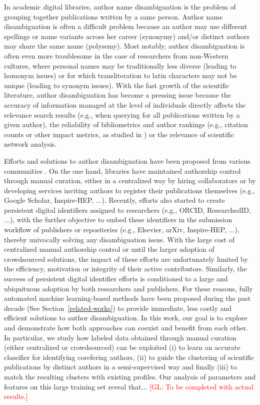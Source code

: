 \documentclass{article}
\newcommand{\glnote}[1]{\textcolor{red}{[GL: #1]}}
\begin{document}
In academic digital libraries, author name disambiguation is the problem of
grouping together publications written by a same person.  Author name
disambiguation is often a difficult problem because an author may use different
spellings or name variants across her career (synonymy) and/or distinct authors may
share the same name (polysemy). Most notably, author disambiguation is often even more
troublesome in the case of researchers from non-Western cultures, where
personal names may be traditionally less diverse (leading to homonym issues) or
for which transliteration to latin characters may not be unique (leading to
synonym issues). With the fast growth of the scientific literature, author
disambiguation has become a pressing issue because the accuracy of information
managed at the level of individuals directly affects the relevance search
results (e.g., when querying for all publications written by a given author),
the reliability of bibliometrics and author rankings (e.g., citation counts or other impact
metrics, as studied in \citep{strotmann2012author}) or the relevance of scientific network analysis.

Efforts and solutions to author disambiguation have been proposed from various
communities \citep{liu2014author}. On the one hand, libraries have maintained
authorship control through manual curation, either in a centralized way by
hiring collaborators or by developing services inviting authors to register
their publications themselves (e.g., Google Scholar, Inspire-HEP, ...). Recently,
efforts also started to create persistent digital identifiers assigned to researchers
(e.g., ORCID, ResearchedID, ...), with the further objective to embed these
identifiers in the submission workflow of publishers or repositeries (e.g.,
Elsevier, arXiv, Inspire-HEP, ...), thereby univocally solving any disambiguation
issue. With the large cost of centralized manual authorship control or until
the larger adoption of crowdsourced solutions, the impact of these efforts are
unfortunately limited by the efficiency, motivation or integrity of their
active contributors. Similarly, the success of persistent digital identifier
efforts is conditioned to a large and ubiquituous adoption by both researchers and publishers.
For these reasons, fully automated machine learning-based methods have been
proposed during the past decade (See Section~\ref{related-works}) to provide immediate, less costly
and efficient solutions to author disambiguation. In this work, our goal
is to explore and demonstrate how both approaches can coexist and benefit from
each other.  In particular, we study how labeled data obtained through manual
curation (either centralized or crowdsourced) can be exploited (i) to learn an
accurate classifier for identifying corefering authors, (ii) to guide the
clustering of scientific publications by distinct authors in a semi-supervised
way and finally (iii) to match the resulting clusters with existing profiles.
Our analysis of parameters and features on this large training set reveal
that... \glnote{To be completed with actual results.}
\end{document}
